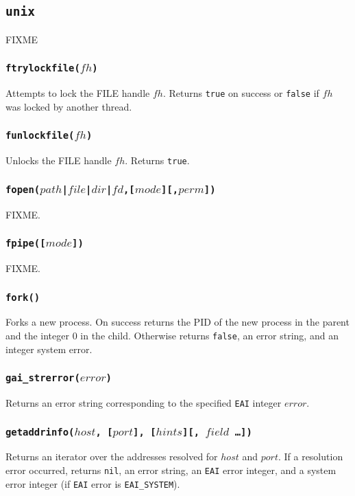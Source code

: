 \documentclass[11pt, oneside]{memoir}
\newcommand*{\true}[0]{\texttt{true}\xspace}
\newcommand*{\false}[0]{\texttt{false}\xspace}
\newcommand*{\nil}[0]{\texttt{nil}\xspace}
\newcommand*{\fn}[1]{\texttt{#1}\xspace}
\newcounter{toccols}
\newenvironment{Module}[1]{
	\subsection{\texttt{#1}}
	\addtocontents{toc}{
		\protect\begin{multicols}{\value{toccols}}
	}
}{
	\addtocontents{toc}{\protect\end{multicols}}
}
\begin{document}
\begin{Module}{unix}
FIXME

\subsubsection[\fn{ftrylockfile}]{\fn{ftrylockfile($fh$)}}

Attempts to lock the FILE handle $fh$. Returns \true on success or \false if $fh$ was locked by another thread.

\subsubsection[\fn{funlockfile}]{\fn{funlockfile($fh$)}}

Unlocks the FILE handle $fh$. Returns \true.

\subsubsection[\fn{fopen}]{\fn{fopen($path$|$file$|$dir$|$fd$,[$mode$][,$perm$])}}

FIXME.

\subsubsection[\fn{fpipe}]{\fn{fpipe([$mode$])}}

FIXME.

\subsubsection[\fn{fork}]{\fn{fork()}}

Forks a new process. On success returns the PID of the new process in the parent and the integer 0 in the child. Otherwise returns \false, an error string, and an integer system error.

\subsubsection[\fn{gai\_strerror}]{\fn{gai\_strerror($error$)}}

Returns an error string corresponding to the specified \texttt{EAI} integer $error$.

\subsubsection[\fn{getaddrinfo}]{\fn{getaddrinfo($host$, [$port$], [$hints$][, $field$ \ldots])}}

Returns an iterator over the addresses resolved for $host$ and $port$. If a resolution error occurred, returns \nil, an error string, an \texttt{EAI} error integer, and a system error integer (if \texttt{EAI} error is \texttt{EAI\_SYSTEM}).


\end{Module}
\end{document}
